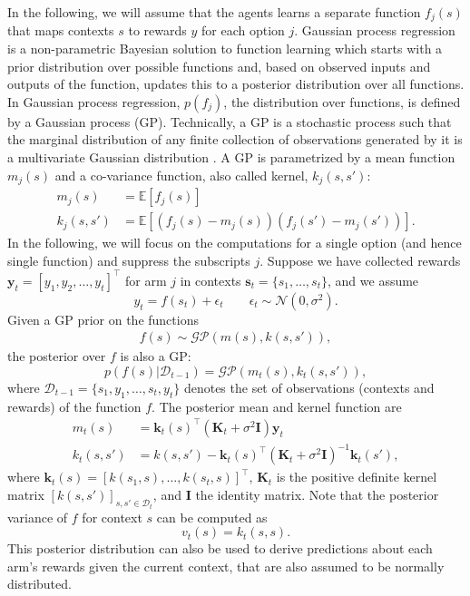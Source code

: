 \documentclass[a4paper,natbib]{apa6}
\begin{document}
In the following, we will assume that the agents learns a separate function $f_j(s)$ that maps contexts $s$ to rewards $y$ for each option $j$. Gaussian process regression is a non-parametric Bayesian solution to function learning which starts with a prior distribution over possible functions and, based on observed inputs and outputs of the function, updates this to a posterior distribution over all functions. In Gaussian process regression, $p(f_j)$, the distribution over functions, is defined by a Gaussian process (GP). Technically, a GP is a stochastic process such that the marginal distribution of any finite collection of observations generated by it is a multivariate Gaussian distribution \citep[see][]{rasmussen2006gaussian}. A GP is parametrized by a mean function $m_j(s)$ and a co-variance function, also called kernel, $k_j(s,s')$:
\begin{align}
m_j(s)&=\mathbb{E}\left[f_j(s)\right]\\
k_j(s,s')&=\mathbb{E}\left[(f_j(s)-m_j(s))(f_j(s')-m_j(s'))\right] .
\end{align}
In the following, we will focus on the computations for a single option (and hence single function) and suppress the subscripts $j$. Suppose we have collected rewards $\mathbf{y}_{t}=[y_1,y_2,\dots,y_t]^\top$ for arm $j$ in contexts $\mathbf{s}_t=\{s_1,\dots,s_t\}$, and we assume 
\begin{equation}
y_{t}=f(s_t)+\epsilon_{t} \quad \quad \epsilon_{t} \sim \mathcal{N}(0,\sigma^2) .
\end{equation}
Given a GP prior on the functions
\begin{align}
f(s) \sim \mathcal{GP}\left(m(s),k(s,s')\right) , 
\end{align}
the posterior over $f$ is also a GP:
\begin{equation}
p(f(s)|\mathcal{D}_{t-1}) = \mathcal{GP}\left(m_t(s),k_t(s,s')\right) ,
\end{equation}
where $\mathcal{D}_{t-1} = \{s_1,y_1,\ldots,s_t,y_t \}$ denotes the set of observations (contexts and rewards) of the function $f$. The posterior mean and kernel function are
\begin{align}
m_{t}(s)&=\mathbf{k}_t(s)^\top(\mathbf{K}_t+\sigma^2\mathbf{I})\mathbf{y}_t\\
k_{t}(s,s')&=k(s,s')-\mathbf{k}_{t}(s)^\top(\mathbf{K}_{t}+\sigma^2 \mathbf{I})^{-1}\mathbf{k}_{t}(s') ,
\end{align}
where $\mathbf{k}_t(s)=[k(s_1,s), \dots, k(s_t,s)]^\top$, $\mathbf{K}_t$ is the positive definite kernel matrix $[k(s,s')]_{s,s' \in \mathcal{D}_t}$, and $\mathbf{I}$ the identity matrix. Note that the posterior variance of $f$ for context $s$ can be computed as 
\begin{equation}
v_t(s) = k_t(s,s) .
\end{equation}
This posterior distribution can also be used to derive predictions about each arm's rewards given the current context, that are also assumed to be normally distributed. 
\end{document}
